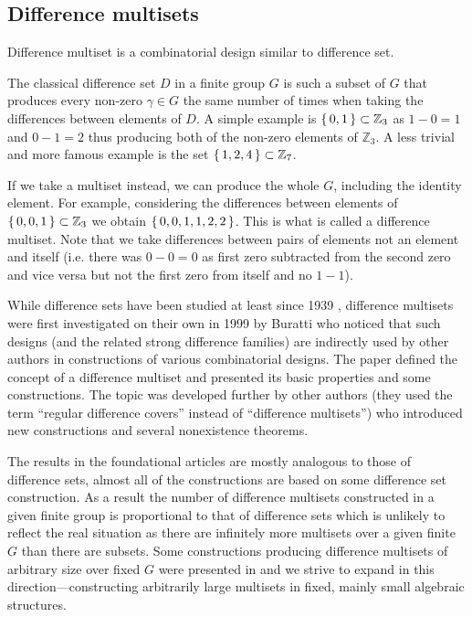 \subsection{Difference multisets}

    Difference multiset is a combinatorial design similar to difference set. %

    The classical difference set $D$ in a finite group $G$ is such a subset of $G$ that produces every non-zero $\gamma \in G$ the same number of times when taking the differences between elements of $D$. A simple example is $\set{0,1} \subset \mathbb Z_3$ as $1-0=1$ and $0-1=2$ thus producing both of the non-zero elements of $\mathbb Z_3$. 
A less trivial and more famous example is the set $\set{1,2,4} \subset \mathbb Z_7$.

    If we take a multiset instead, we can produce the whole $G$, including the identity element. For example, considering the differences between elements of $\set{0,0,1} \subset \mathbb Z_3$ we obtain $\set{0,0,1,1,2,2}$. This is what is called a difference multiset. Note that we take differences between pairs of elements not an element and itself (i.e. there was $0-0=0$ as first zero subtracted from the second zero and vice versa but not the first zero from itself and no $1-1$).

    While difference sets have been studied at least since 1939 \cite{bose1939construction}, difference multisets were first investigated on their own in 1999 by Buratti \cite{buratti1999old} who noticed that such designs (and the related strong difference families) are indirectly used by other authors in constructions of various combinatorial designs. The paper defined the concept of a difference multiset and presented its basic properties and some constructions. The topic was developed further by other authors \cite{arasu2005cyclic, arasu2005regular} (they used the term ``regular difference covers'' instead of ``difference multisets'') who introduced new constructions and several nonexistence theorems.

    The results in the foundational articles are mostly analogous to those of difference sets, almost all of the constructions are based on some difference set construction. As a result the number of difference multisets constructed in a given finite group is proportional to that of difference sets which is unlikely to reflect the real situation as there are infinitely more multisets over a given finite $G$ than there are subsets. Some constructions producing difference multisets of arbitrary size over fixed $G$ were presented in \cite{momihara2009strong} and we strive to expand in this direction---constructing arbitrarily large multisets in fixed, mainly small algebraic structures.

